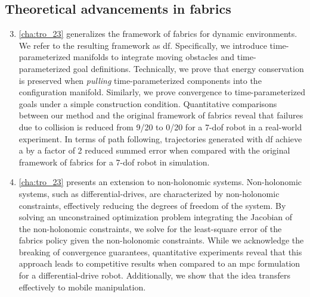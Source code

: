 \subsection{Theoretical advancements in \ac{fabrics}}
\begin{enumerate}
    \setcounter{enumi}{2}
    \item \cref{cha:tro_23} generalizes the framework of \ac{fabrics}
      for dynamic environments. We refer to the resulting
      framework as \ac{df}. Specifically, we introduce
      time-parameterized manifolds to integrate moving
      obstacles and time-parameterized goal definitions.
      Technically,
      we prove that energy conservation is preserved when
      \textit{pulling} time-parameterized components into
      the configuration manifold. 
      Similarly, we prove convergence to
      time-parameterized goals under a simple construction
      condition. Quantitative comparisons between our method
      and the original framework of \ac{fabrics} reveal
      that failures due to collision is reduced from 9/20
      to 0/20 for a 7-\ac{dof} robot in a real-world experiment.
      In terms of path following, trajectories generated
      with \ac{df} achieve a by a factor of 2 reduced summed error 
      when compared with the original framework of
      \ac{fabrics} for a 7-\ac{dof} robot in simulation.
    \item \cref{cha:tro_23} presents an extension to
      non-holonomic systems. Non-holonomic systems, such as
      differential-drives, are characterized by
      non-holonomic constraints, effectively reducing the
      degrees of freedom of the system. By solving an
      unconstrained optimization problem integrating the
      Jacobian of the non-holonomic constraints, we solve
      for the least-square error of the \ac{fabrics} policy
      given the non-holonomic constraints. While we
      acknowledge the breaking of convergence guarantees,
      quantitative experiments reveal that this approach leads to
      competitive results when compared to an \ac{mpc}
      formulation for a differential-drive robot.
      Additionally, we show that the idea transfers effectively
      to mobile manipulation.
\end{enumerate}

